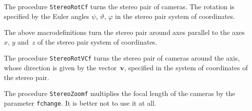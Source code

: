 \vspace{\bigskipamount}
The procedure \texttt{StereoRotCf} turns the stereo pair of cameras.
The rotation is specified by the Euler angles $\psi$, $\vartheta$,  
$\varphi$ in the stereo pair system of coordinates.

\newpage
The above macrodefinitions turn the stereo pair around axes parallel to the
axes $x$, $y$ and~$z$ of the stereo pair system of coordinates.  

\vspace{\bigskipamount}
The procedure \texttt{StereoRotVCf} turns the stereo pair of cameras
around the axis, whose direction is given by the vector~$\bm{v}$, specified
in the system of coordinates of the stereo pair.

\vspace{\bigskipamount}
The procedure \texttt{StereoZoomf} multiplies the focal length of the
cameras by the parameter \texttt{fchange}. It is better not to use it at all.


